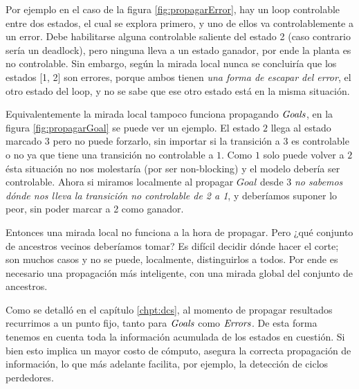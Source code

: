 Por ejemplo en el caso de la figura \ref{fig:propagarError}, hay un loop controlable entre dos estados, el cual se explora primero, y uno de ellos va controlablemente a un error. Debe habilitarse alguna controlable saliente del estado 2 (caso contrario sería un deadlock), pero ninguna lleva a un estado ganador, por ende la planta es no controlable. Sin embargo, según la mirada local nunca se concluiría que los estados [1, 2] son errores, porque ambos tienen \textit{una forma de escapar del error}, el otro estado del loop, y no se sabe que ese otro estado está en la misma situación. 

Equivalentemente la mirada local tampoco funciona propagando $\mathit{Goals}$, en la figura \ref{fig:propagarGoal} se puede ver un ejemplo. El estado $2$ llega al estado marcado $3$ pero no puede forzarlo, sin importar si la transición a $3$ es controlable o no ya que tiene una transición no controlable a $1$. Como $1$ solo puede volver a $2$ ésta situación no nos molestaría (por ser non-blocking) y el modelo debería ser controlable. Ahora si miramos localmente al propagar $Goal$ desde $3$ \textit{no sabemos dónde nos lleva la transición no controlable de 2 a 1}, y deberíamos suponer lo peor, sin poder marcar a 2 como ganador.

Entonces una mirada local no funciona a la hora de propagar. Pero ¿qué conjunto de ancestros vecinos deberíamos tomar? Es difícil decidir dónde hacer el corte; son muchos casos y no se puede, localmente, distinguirlos a todos. Por ende es necesario una propagación más inteligente, con una mirada global del conjunto de ancestros.

Como se detalló en el capítulo \ref{chpt:dcs}, al momento de propagar resultados recurrimos a un punto fijo, tanto para $\mathit{Goals}$ como $\mathit{Errors}$. De esta forma tenemos en cuenta toda la información acumulada de los estados en cuestión. Si bien esto implica un mayor costo de cómputo, asegura la correcta propagación de información, lo que más adelante facilita, por ejemplo, la detección de ciclos perdedores.\\

